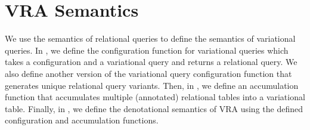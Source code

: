 \section{VRA Semantics }
\label{sec:vrasem}


We use the semantics of relational queries to define the semantics of 
variational queries. In , we define the configuration function
for variational queries which takes a configuration and a variational query
and returns a relational query. We also define another version of the
variational query configuration function that generates unique relational
query variants. Then, in , we define an accumulation function that accumulates
multiple (annotated) relational tables into a variational table. Finally, in , we  
define the denotational semantics of VRA using the defined configuration and
accumulation functions.
%


